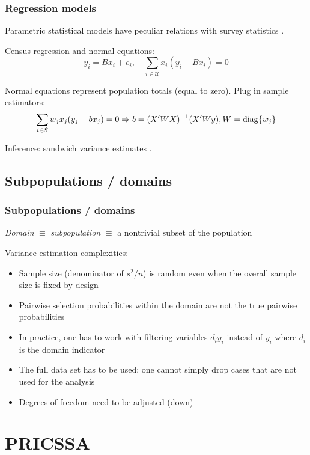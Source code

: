 \documentclass[handout]{beamer}
\begin{document}
\begin{frame}\frametitle{Regression models}

Parametric statistical models have peculiar relations with survey statistics
\citep{skinner:1989,binder:roberts:2003,binder:roberts:2009,pfeffermann:2011:whymodel}.

Census regression and normal equations:
$$
y_i = B x_i + e_i, \quad \sum_{i\in\mathcal{U}} x_i (y_i - B x_i) = 0
$$

Normal equations represent population totals (equal to zero). Plug in sample estimators:
$$
\sum_{i\in\mathcal{S}} w_j x_j (y_j - b x_j) = 0 \Rightarrow b = (X'WX)^{-1} (X'Wy), W = {\rm diag}\{ w_j \}
$$

Inference: sandwich variance estimates \citep{fuller:1975,binder:1983}.

\end{frame}

\subsection{Subpopulations / domains}

\begin{frame}\frametitle{Subpopulations / domains}

\textit{Domain} $\equiv$ \textit{subpopulation} $\equiv$ a nontrivial subset of the population

\bigskip

Variance estimation complexities:
\begin{itemize}
    \item Sample size (denominator of $s^2/n$) is random even when the overall sample size is fixed by design
    \item Pairwise selection probabilities within the domain are not the true pairwise probabilities
    \item In practice, one has to work with filtering variables $d_i y_i$ instead of $y_i$ where
        $d_i$ is the domain indicator
    \item The full data set has to be used; one cannot simply drop cases that are not used for the analysis
    \item Degrees of freedom need to be adjusted (down)
\end{itemize}

\citet{west:berglund:heeringa:2008}

\end{frame}

\section{PRICSSA}
\end{document}

